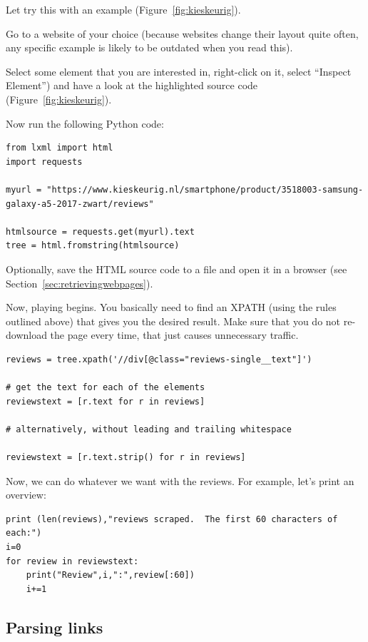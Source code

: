 \documentclass[a4paper,12pt]{book}
\begin{document}
Let try this with an example (Figure~\ref{fig:kieskeurig}).

Go to a website of your choice (because websites change their layout quite often, any specific example is likely to be outdated when you read this).

Select some element that you are interested in, right-click on it, select ``Inspect Element'') and have a look at the highlighted source code (Figure~\ref{fig:kieskeurig}). 

Now run the following Python code:

\begin{lstlisting}
from lxml import html
import requests

myurl = "https://www.kieskeurig.nl/smartphone/product/3518003-samsung-galaxy-a5-2017-zwart/reviews"

htmlsource = requests.get(myurl).text
tree = html.fromstring(htmlsource)        
\end{lstlisting}

Optionally, save the HTML source code to a file and open it in a browser (see Section~\ref{sec:retrievingwebpages}).

Now, playing begins. You basically need to find an XPATH (using the rules outlined above) that gives you the desired result. Make sure that you do not re-download the page every time, that just causes unnecessary traffic.

\begin{lstlisting}
reviews = tree.xpath('//div[@class="reviews-single__text"]')

# get the text for each of the elements
reviewstext = [r.text for r in reviews]

# alternatively, without leading and trailing whitespace

reviewstext = [r.text.strip() for r in reviews]
\end{lstlisting}

Now, we can do whatever we want with the reviews. For example, let's print an overview:

\begin{lstlisting}
print (len(reviews),"reviews scraped.  The first 60 characters of each:")
i=0
for review in reviewstext:
    print("Review",i,":",review[:60])
    i+=1
\end{lstlisting}



\FloatBarrier

\subsection{Parsing links}
\end{document}
